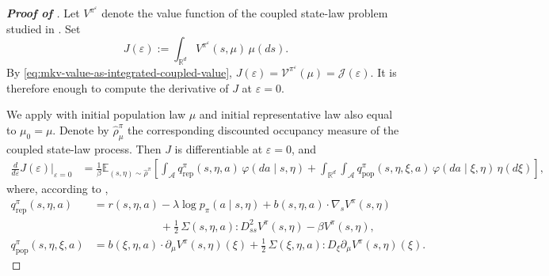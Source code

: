 \documentclass[a4paper, 10pt, english, reqno]{amsart}
\begin{document}
\begin{proof}[\textbf{Proof of }]
Let $V^{\pi^\varepsilon}$ denote the value function of the coupled
state-law problem studied in \cite{firstpaper}. Set
\[
  J(\varepsilon)
  :=
  \int_{\mathbb R^d}
  V^{\pi^\varepsilon}(s,\mu)\,\mu(ds).
\]
By \eqref{eq:mkv-value-as-integrated-coupled-value},
$J(\varepsilon)=\mathcal V^{\pi^\varepsilon}(\mu)=\mathcal J(\varepsilon)$.
It is therefore enough to compute the derivative of $J$ at
$\varepsilon=0$.

We apply \cite[Theorem~4.6]{firstpaper} with initial population law
$\mu$ and initial representative law also equal to $\mu_0=\mu$. Denote by
$\widehat\rho_\mu^\pi$ the corresponding discounted occupancy measure of
the coupled state-law process. Then $J$ is differentiable at
$\varepsilon=0$, and
\[
\begin{aligned}
\frac{d}{d\varepsilon}J(\varepsilon)\bigg|_{\varepsilon=0}
&=\frac{1}{\beta}
\mathbb E_{(s,\eta)\sim\widehat\rho^\pi}\!\left[
\int_{\mathcal A}
q_{\mathrm{rep}}^\pi(s,\eta,a)\,
\varphi(da\mid s,\eta)
+
\int_{\mathbb R^d}\!\int_{\mathcal A}
q_{\mathrm{pop}}^\pi(s,\eta,\xi,a)\,
\varphi(da\mid \xi,\eta)\,\eta(d\xi)
\right],
\end{aligned}
\]
where, according to \cite[Definition~4.2]{firstpaper},
\[
\begin{aligned}
q_{\mathrm{rep}}^\pi(s,\eta,a)
&=
r(s,\eta,a)-\lambda\log p_\pi(a\mid s,\eta)
+b(s,\eta,a)\cdot\nabla_s V^\pi(s,\eta)
\\
&\qquad\qquad\qquad+\frac12\,\Sigma(s,\eta,a):D^2_{ss}V^\pi(s,\eta)-\beta V^\pi(s,\eta),
\\
q_{\mathrm{pop}}^\pi(s,\eta,\xi,a)
&=
b(\xi,\eta,a)\cdot\partial_\mu V^\pi(s,\eta)(\xi)
+\frac12\,\Sigma(\xi,\eta,a):D_\xi\partial_\mu V^\pi(s,\eta)(\xi).
\end{aligned}
\]


\end{proof}
\end{document}
